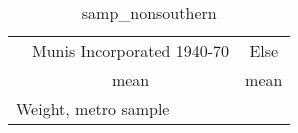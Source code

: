 \begin{table}[htbp]\centering
\def\sym#1{\ifmmode^{#1}\else\(^{#1}\)\fi}
\caption{samp\_nonsouthern \label{tab1}}
\begin{tabular}{l*{2}{c}}
\toprule
                    &\multicolumn{1}{c}{Munis Incorporated 1940-70}&\multicolumn{1}{c}{Else}\\
                    &        mean&        mean\\
\midrule
\bottomrule
\multicolumn{3}{l}{\footnotesize Weight, metro sample}\\
\end{tabular}
\end{table}
